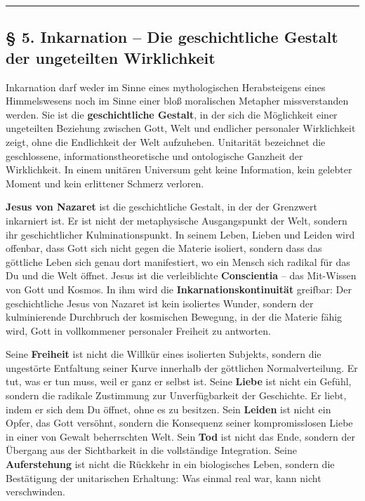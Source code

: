 \documentclass[
  ngerman,
]{article}
\begin{document}
\begin{center}\rule{0.5\linewidth}{0.5pt}\end{center}

\subsection{§ 5. Inkarnation -- Die geschichtliche Gestalt der
ungeteilten
Wirklichkeit}\label{inkarnation-die-geschichtliche-gestalt-der-ungeteilten-wirklichkeit}

Inkarnation darf weder im Sinne eines mythologischen Herabsteigens eines
Himmelswesens noch im Sinne einer bloß moralischen Metapher
missverstanden werden. Sie ist die \textbf{geschichtliche Gestalt}, in
der sich die Möglichkeit einer ungeteilten Beziehung zwischen Gott, Welt
und endlicher personaler Wirklichkeit zeigt, ohne die Endlichkeit der
Welt aufzuheben. Unitarität bezeichnet die geschlossene,
informationstheoretische und ontologische Ganzheit der Wirklichkeit. In
einem unitären Universum geht keine Information, kein gelebter Moment
und kein erlittener Schmerz verloren.

\textbf{Jesus von Nazaret} ist die geschichtliche Gestalt, in der der
Grenzwert inkarniert ist. Er ist nicht der metaphysische Ausgangspunkt
der Welt, sondern ihr geschichtlicher Kulminationspunkt. In seinem
Leben, Lieben und Leiden wird offenbar, dass Gott sich nicht gegen die
Materie isoliert, sondern dass das göttliche Leben sich genau dort
manifestiert, wo ein Mensch sich radikal für das Du und die Welt öffnet.
Jesus ist die verleiblichte \textbf{Conscientia} -- das Mit-Wissen von
Gott und Kosmos. In ihm wird die \textbf{Inkarnationskontinuität}
greifbar: Der geschichtliche Jesus von Nazaret ist kein isoliertes
Wunder, sondern der kulminierende Durchbruch der kosmischen Bewegung, in
der die Materie fähig wird, Gott in vollkommener personaler Freiheit zu
antworten.

Seine \textbf{Freiheit} ist nicht die Willkür eines isolierten Subjekts,
sondern die ungestörte Entfaltung seiner Kurve innerhalb der göttlichen
Normalverteilung. Er tut, was er tun muss, weil er ganz er selbst ist.
Seine \textbf{Liebe} ist nicht ein Gefühl, sondern die radikale
Zustimmung zur Unverfügbarkeit der Geschichte. Er liebt, indem er sich
dem Du öffnet, ohne es zu besitzen. Sein \textbf{Leiden} ist nicht ein
Opfer, das Gott versöhnt, sondern die Konsequenz seiner kompromisslosen
Liebe in einer von Gewalt beherrschten Welt. Sein \textbf{Tod} ist nicht
das Ende, sondern der Übergang aus der Sichtbarkeit in die vollständige
Integration. Seine \textbf{Auferstehung} ist nicht die Rückkehr in ein
biologisches Leben, sondern die Bestätigung der unitarischen Erhaltung:
Was einmal real war, kann nicht verschwinden.
\end{document}
